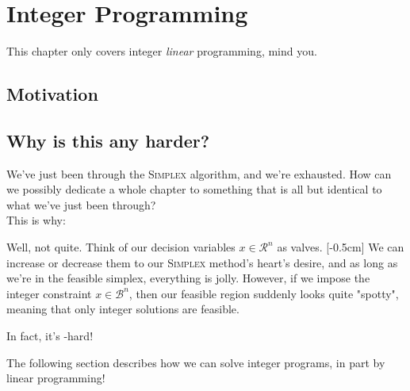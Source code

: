 \section{Integer Programming}

This chapter only covers integer \textit{linear} programming, mind you.

\subsection{Motivation}

\subsection{Why is this any harder?}

We've just been through the \textsc{Simplex} algorithm, and we're exhausted. How can we
possibly dedicate a whole chapter to something that is all but identical to what
we've just been through?\\

This is why:


Well, not quite. Think of our decision variables $x \in \mathcal{R}^n$ as valves.
[-0.5cm]
We can increase or decrease them to our \textsc{Simplex} method's heart's desire, and as
long as we're in the feasible simplex, everything is jolly. However, if we impose
the integer constraint $x \in \mathcal{B}^n$, then our feasible region suddenly
looks quite "spotty", meaning that only integer solutions are feasible. 

In fact, it's \np-hard! %

The following section describes how we can solve integer programs, in part by
linear programming!

